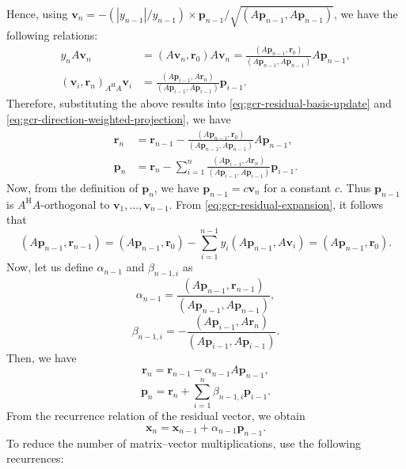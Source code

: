 {Hence, using $\bm v_n=-(|y_{n-1}|/y_{n-1})\times\bm p_{n-1}/\sqrt{(A\bm p_{n-1},A\bm p_{n-1})}$, we have the following relations:}
\[\begin{aligned}y_nA\bm v_n&=(A\bm v_n,\bm r_0)A\bm v_n=\frac{(A\bm p_{n-1},\bm r_0)}{(A\bm p_{n-1},A\bm p_{n-1})}A\bm p_{n-1},\\(\bm v_i,\bm r_n)_{A^{\mathrm H}A}\bm v_i&=\frac{(A\bm p_{i-1},A\bm r_n)}{(A\bm p_{i-1},A\bm p_{i-1})}\bm p_{i-1}.\end{aligned}\]
{Therefore, substituting the above results into \eqref{eq:gcr-residual-basis-update} and \eqref{eq:gcr-direction-weighted-projection}, we have}
\[\begin{aligned}\bm r_n&=\bm r_{n-1}-\frac{(A\bm p_{n-1},\bm r_0)}{(A\bm p_{n-1},A\bm p_{n-1})}A\bm p_{n-1},\\\bm p_n&=\bm r_n-\sum_{i=1}^n\frac{(A\bm p_{i-1},A\bm r_n)}{(A\bm p_{i-1},A\bm p_{i-1})}\bm p_{i-1}.\end{aligned}\]
{Now, from the definition of $\bm p_n$, we have $\bm p_{n-1}=c\bm v_n$ for a constant $c$. Thus $\bm p_{n-1}$ is $A^{\mathrm H}A$-orthogonal to $\bm v_1,\ldots,\bm v_{n-1}$. From \eqref{eq:gcr-residual-expansion}, it follows that}
\[(A\bm p_{n-1},\bm r_{n-1})=(A\bm p_{n-1},\bm r_0)-\sum_{i=1}^{n-1}y_i(A\bm p_{n-1},A\bm v_i)=(A\bm p_{n-1},\bm r_0).\]
{Now, let us define $\alpha_{n-1}$ and $\beta_{n-1,i}$ as}
\begin{equation}\label{eq:gcr-alpha}\alpha_{n-1}=\frac{(A\bm p_{n-1},\bm r_{n-1})}{(A\bm p_{n-1},A\bm p_{n-1})},\end{equation}
\begin{equation}\label{eq:gcr-beta}\beta_{n-1,i}=-\frac{(A\bm p_{i-1},A\bm r_n)}{(A\bm p_{i-1},A\bm p_{i-1})}.\end{equation}
{Then, we have}
\begin{equation}\label{eq:gcr-residual-recurrence}\bm r_n=\bm r_{n-1}-\alpha_{n-1}A\bm p_{n-1},\end{equation}
\begin{equation}\label{eq:gcr-direction-recurrence}\bm p_n=\bm r_n+\sum_{i=1}^n\beta_{n-1,i}\bm p_{i-1}.\end{equation}
{From the recurrence relation of the residual vector, we obtain}
\begin{equation}\label{eq:gcr-solution-recurrence}\bm x_n=\bm x_{n-1}+\alpha_{n-1}\bm p_{n-1}.\end{equation}
{To reduce the number of matrix--vector multiplications, use the following recurrences:}
